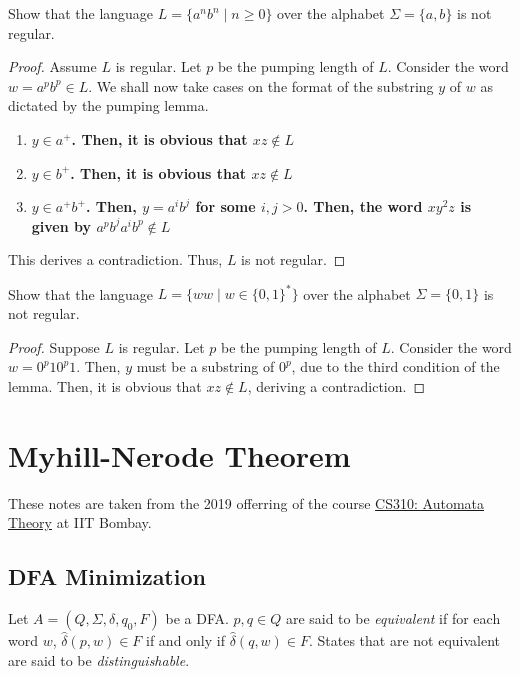 \begin{example}
    Show that the language $L = \{a^nb^n\mid n\ge 0\}$ over the alphabet $\Sigma=\{a, b\}$ is not regular.
\end{example}
\begin{proof}
    Assume $L$ is regular. Let $p$ be the pumping length of $L$. Consider the word $w = a^pb^p\in L$. We shall now take cases on the format of the substring $y$ of $w$ as dictated by the pumping lemma.  
    \begin{enumerate}
        \item \bfseries$y\in a^+$\normalfont. Then, it is obvious that $xz\notin L$
        \item \bfseries$y\in b^+$\normalfont. Then, it is obvious that $xz\notin L$
        \item \bfseries$y\in a^+b^+$\normalfont. Then, $y = a^ib^j$ for some $i, j > 0$. Then, the word $xy^2z$ is given by $a^pb^ja^ib^p\notin L$
    \end{enumerate}
    This derives a contradiction. Thus, $L$ is not regular.
\end{proof}

\begin{example}
    Show that the language $L = \{ww\mid w\in\{0,1\}^*\}$ over the alphabet $\Sigma = \{0, 1\}$ is not regular.
\end{example}
\begin{proof}
    Suppose $L$ is regular. Let $p$ be the pumping length of $L$. Consider the word $w = 0^p10^p1$. Then, $y$ must be a substring of $0^p$, due to the third condition of the lemma. Then, it is obvious that $xz\notin L$, deriving a contradiction.
\end{proof}

\section{Myhill-Nerode Theorem}
These notes are taken from the 2019 offerring of the course \href{https://www.cse.iitb.ac.in/~akg/courses/2019-cs310}{CS310: Automata Theory} at IIT Bombay.
\subsection{DFA Minimization}
\begin{definition}
    Let $A = (Q,\Sigma,\delta,q_0,F)$ be a DFA. $p,q\in Q$ are said to be \textit{equivalent} if for each word $w$, $\hat{\delta}(p, w)\in F$ if and only if $\hat{\delta}(q,w)\in F$. States that are not equivalent are said to be \textit{distinguishable}.
\end{definition}

